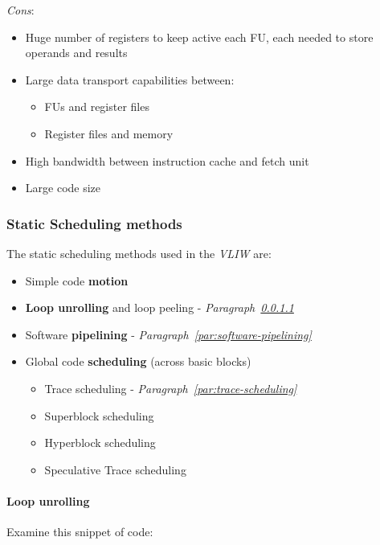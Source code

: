 \documentclass[english]{article}
\begin{document}
\bigskip
\textit{Cons}:
\begin{itemize}
  \item Huge number of registers to keep active each FU, each needed to store operands and results
  \item Large data transport capabilities between:
        \begin{itemize}
          \item FUs and register files
          \item Register files and memory
        \end{itemize}
  \item High bandwidth between instruction cache and fetch unit
  \item Large code size
\end{itemize}

\subsubsection{Static Scheduling methods}

The static scheduling methods used in the \textit{VLIW} are:

\begin{itemize}
  \item Simple code \textbf{motion}
  \item \textbf{Loop unrolling} and loop peeling - \textit{Paragraph~\ref{par:loop-unrolling}}
  \item Software \textbf{pipelining} - \textit{Paragraph~\ref{par:software-pipelining}}
  \item Global code \textbf{scheduling} (across basic blocks)
        \begin{itemize}
          \item Trace scheduling - \textit{Paragraph~\ref{par:trace-scheduling}}
          \item Superblock scheduling
          \item Hyperblock scheduling
          \item Speculative Trace scheduling
        \end{itemize}
\end{itemize}

\paragraph{Loop unrolling}
\label{par:loop-unrolling}

Examine this snippet of code:
\end{document}

